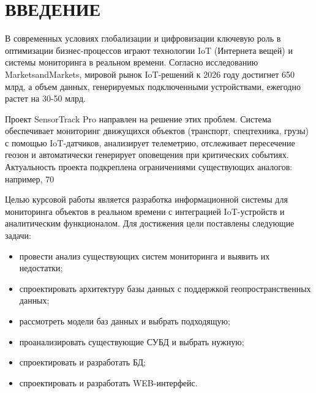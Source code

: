 \maketableofcontents

\chapter*{ВВЕДЕНИЕ}

В современных условиях глобализации и цифровизации ключевую роль в оптимизации бизнес-процессов играют технологии IoT (Интернета вещей) и системы мониторинга в реальном времени. Согласно исследованию MarketsandMarkets, мировой рынок IoT-решений к 2026 году достигнет 650 млрд, а объем данных, генерируемых подключенными устройствами, ежегодно растет на 30-50 млрд.

Проект SensorTrack Pro направлен на решение этих проблем. Система обеспечивает мониторинг движущихся объектов (транспорт, спецтехника, грузы) с помощью IoT-датчиков, анализирует телеметрию, отслеживает пересечение геозон и автоматически генерирует оповещения при критических событиях. Актуальность проекта подкреплена ограничениями существующих аналогов: например, 70%

Целью курсовой работы является разработка информационной системы для мониторинга объектов в реальном времени с интеграцией IoT-устройств и аналитическим функционалом. Для достижения цели поставлены следующие задачи:

\begin{itemize}
	\item провести анализ существующих систем мониторинга и выявить их недостатки;
	\item спроектировать архитектуру базы данных с поддержкой геопространственных данных;
	\item рассмотреть модели баз данных и выбрать подходящую;
	\item проанализировать существующие СУБД и выбрать нужную;
 	\item спроектировать и разработать БД;
    \item спроектировать и разработать WEB-интерфейс.
\end{itemize}
